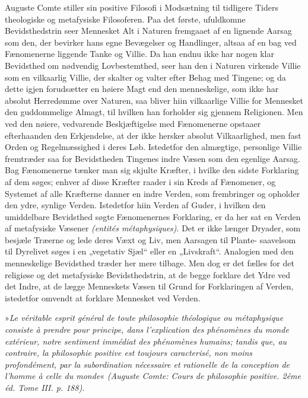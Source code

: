 \documentclass[12pt,a4paper,openany]{book}
\newcommand{\opage}[1]{\marginnote{\footnotesize\textit{[#1]}}}
\begin{document}
Auguste Comte stiller sin positive Filosofi i Modsætning
til tidligere Tiders theologiske og metafysiske Filosoferen.
Paa det første, ufuldkomne Bevidsthedstrin seer Mennesket
Alt i Naturen fremgaaet af en lignende Aarsag som den, der
bevirker hans egne Bevægelser og Handlinger, altsaa af en
bag ved Fænomenerne liggende Tanke og Villie. Da han
endnu ikke har nogen klar Bevidsthed om nødvendig Lovbestemthed,
seer han den i Naturen virkende Villie som en vilkaarlig
Villie, der skalter og valter efter Behag med Tingene; og da
dette igjen forudsætter en høiere Magt end den menneskelige,
som ikke har absolut Herredømme over Naturen, saa bliver
hiin vilkaarlige Villie for Mennesket den guddommelige Almagt,
til hvilken han forholder sig gjennem Religionen.
Men ved den nøiere, vedvarende Beskjæftigelse med Fænomenerne
opstaaer efterhaanden den Erkjendelse, at der ikke
hersker absolut Vilkaarlighed, men fast Orden og Regelmæssighed
i deres Løb. Istedetfor den almægtige, personlige
Villie fremtræder saa for Bevidstheden Tingenes indre Væsen
som den egenlige Aarsag. Bag Fænomenerne tænker man
sig skjulte Kræfter, i hvilke den sidste Forklaring af dem
søges; enhver af disse Kræfter raader i sin Kreds af Fænomener,
og Systemet af alle Kræfterne danner en indre
Verden, som frembringer og opholder den ydre, synlige
Verden. Istedetfor hiin Verden af Guder, i hvilken den
umiddelbare Bevidsthed søgte Fænomenernes Forklaring, er
da her sat en Verden af metafysiske Væsener \textit{(entités métaphysiques)}.
Det er ikke længer Dryader, som besjæle
Træerne og lede deres Væxt og Liv, men Aarsagen til
Plante- saavelsom til Dyrelivet søges i en „vegetativ Sjæl“
eller en „Livskraft“. Analogien med den menneskelige Bevidsthed
træder her mere tilbage. Men dog er det fælles
for det religiøse og det metafysiske Bevidsthedstrin, at de
begge forklare det Ydre ved det Indre, at de lægge Menneskets
Væsen til Grund for Forklaringen af Verden, istedetfor
omvendt at forklare Mennesket ved Verden.

\opage{201}»\textit{Le véritable esprit général de toute philosophie théologique
ou métaphysique consiste à prendre pour principe,
dans l'explication des phénomènes du monde extérieur,
notre sentiment immédiat des phénomènes humains; tandis
que, au contraire, la philosophie positive est toujours caracterisé,
non moins profondément, par la subordination
nécessaire et rationelle de la conception de l'homme à celle
du monde}« \textit{(Auguste Comte: Cours de philosophie positive.
2éme éd. Tome III. p. 188)}.
\end{document}
